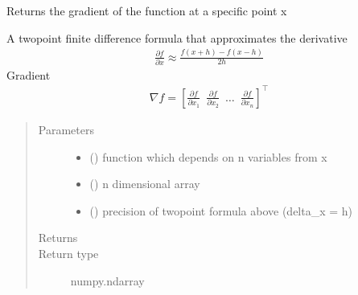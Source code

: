 \documentclass[letterpaper,10pt,english,openany,oneside]{sphinxmanual}
\begin{document}
\begin{fulllineitems}
\label{\detokenize{links:Inner_point.algorithms.gradient}}
\sphinxAtStartPar
Returns the gradient of the function at a specific point x

\sphinxAtStartPar
A two\sphinxhyphen{}point finite difference formula that approximates the derivative
\begin{equation}\label{equation:links:links:0}
\begin{split}\displaystyle \frac{\partial f}{\partial x} \approx {\frac {f(x+h)-f(x-h)}{2h}}\end{split}
\end{equation}
\sphinxAtStartPar
Gradient
\begin{equation}\label{equation:links:links:1}
\begin{split}\displaystyle \nabla f = \left[\frac{\partial f}{\partial x_1} \enspace \frac{\partial f}{\partial x_2}
\enspace \dots \enspace \frac{\partial f}{\partial x_n}\right]^\top\end{split}
\end{equation}\begin{quote}\begin{description}
\item[{Parameters}] \leavevmode\begin{itemize}
\item {} 
\sphinxAtStartPar
{} (\sphinxstyleliteralemphasis{\sphinxupquote{{[}}}\sphinxstyleliteralemphasis{\sphinxupquote{{[}}}\sphinxstyleliteralemphasis{\sphinxupquote{{]}}}\sphinxstyleliteralemphasis{\sphinxupquote{, }}\sphinxstyleliteralemphasis{\sphinxupquote{{]}}}) \textendash{} function which depends on n variables from x

\item {} 
\sphinxAtStartPar
{} () \textendash{} n \sphinxhyphen{} dimensional array

\item {} 
\sphinxAtStartPar
{} () \textendash{} precision of two\sphinxhyphen{}point formula above (delta\_x = h)

\end{itemize}

\item[{Returns}] \leavevmode
\sphinxAtStartPar


\item[{Return type}] \leavevmode
\sphinxAtStartPar
numpy.ndarray

\end{description}\end{quote}

\end{fulllineitems}
\end{document}
